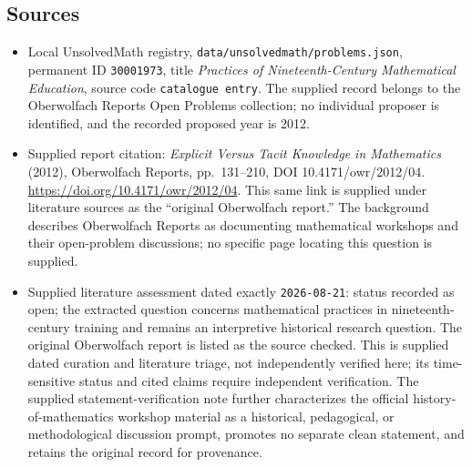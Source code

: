 \documentclass[11pt]{article}
\begin{document}
\subsection{Sources}
\begin{itemize}
\item Local UnsolvedMath registry, \texttt{data/unsolvedmath/problems.json}, permanent ID \texttt{30001973}, title \emph{Practices of Nineteenth-Century Mathematical Education}, source code \texttt{catalogue entry}. The supplied record belongs to the Oberwolfach Reports Open Problems collection; no individual proposer is identified, and the recorded proposed year is 2012.
\item Supplied report citation: \emph{Explicit Versus Tacit Knowledge in Mathematics} (2012), Oberwolfach Reports, pp.~131--210, DOI 10.4171/owr/2012/04. \url{https://doi.org/10.4171/owr/2012/04}. This same link is supplied under literature sources as the ``original Oberwolfach report.'' The background describes Oberwolfach Reports as documenting mathematical workshops and their open-problem discussions; no specific page locating this question is supplied.
\item Supplied literature assessment dated exactly \texttt{2026-08-21}: status recorded as open; the extracted question concerns mathematical practices in nineteenth-century training and remains an interpretive historical research question. The original Oberwolfach report is listed as the source checked. This is supplied dated curation and literature triage, not independently verified here; its time-sensitive status and cited claims require independent verification. The supplied statement-verification note further characterizes the official history-of-mathematics workshop material as a historical, pedagogical, or methodological discussion prompt, promotes no separate clean statement, and retains the original record for provenance.
\end{itemize}
\end{document}
